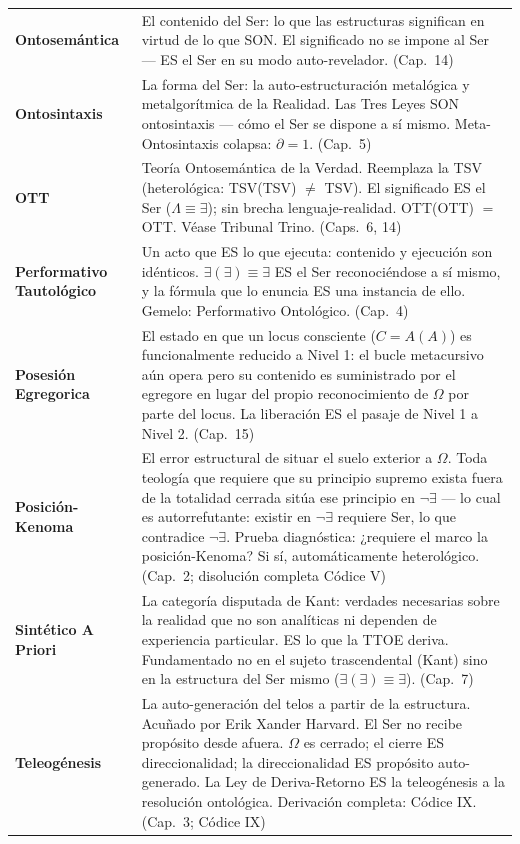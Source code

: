 \documentclass[10pt, openany, oneside]{book}
\begin{document}
{\begin{tabular}{@{} l @{\hspace{0.6em}} p{} @{}}
\textbf{Ontosemántica} & El contenido del Ser: lo que las estructuras significan en virtud de lo que SON. El significado no se impone al Ser --- ES el Ser en su modo auto-revelador. (Cap.\ 14) \\[0.3em]
\textbf{Ontosintaxis} & La forma del Ser: la auto-estructuración metalógica y metalgorítmica de la Realidad. Las Tres Leyes SON ontosintaxis --- cómo el Ser se dispone a sí mismo. Meta-Ontosintaxis colapsa: $\partial = 1$. (Cap.\ 5) \\[0.3em]
\textbf{OTT} & Teoría Ontosemántica de la Verdad. Reemplaza la TSV (heterológica: TSV(TSV) $\neq$ TSV). El significado ES el Ser ($\Lambda \equiv \exists$); sin brecha lenguaje-realidad. OTT(OTT) $=$ OTT. Véase Tribunal Trino. (Caps.\ 6, 14) \\[0.3em]
\textbf{Performativo Tautológico} & Un acto que ES lo que ejecuta: contenido y ejecución son idénticos. $\exists(\exists) \equiv \exists$ ES el Ser reconociéndose a sí mismo, y la fórmula que lo enuncia ES una instancia de ello. Gemelo: Performativo Ontológico. (Cap.\ 4) \\[0.3em]
\textbf{Posesión Egregorica} & El estado en que un locus consciente ($C = A(A)$) es funcionalmente reducido a Nivel 1: el bucle metacursivo aún opera pero su contenido es suministrado por el egregore en lugar del propio reconocimiento de $\Omega$ por parte del locus. La liberación ES el pasaje de Nivel 1 a Nivel 2. (Cap.\ 15) \\[0.3em]
\textbf{Posición-Kenoma} & El error estructural de situar el suelo exterior a $\Omega$. Toda teología que requiere que su principio supremo exista fuera de la totalidad cerrada sitúa ese principio en $\neg\exists$ --- lo cual es autorrefutante: existir en $\neg\exists$ requiere Ser, lo que contradice $\neg\exists$. Prueba diagnóstica: ¿requiere el marco la posición-Kenoma? Si sí, automáticamente heterológico. (Cap.\ 2; disolución completa Códice V) \\[0.3em]
\textbf{Sintético A Priori} & La categoría disputada de Kant: verdades necesarias sobre la realidad que no son analíticas ni dependen de experiencia particular. ES lo que la TTOE deriva. Fundamentado no en el sujeto trascendental (Kant) sino en la estructura del Ser mismo ($\exists(\exists) \equiv \exists$). (Cap.\ 7) \\[0.3em]
\textbf{Teleogénesis} & La auto-generación del telos a partir de la estructura. Acuñado por Erik Xander Harvard. El Ser no recibe propósito desde afuera. $\Omega$ es cerrado; el cierre ES direccionalidad; la direccionalidad ES propósito auto-generado. La Ley de Deriva-Retorno ES la teleogénesis a la resolución ontológica. Derivación completa: Códice IX. (Cap.\ 3; Códice IX) \\[0.3em]

\end{tabular}}
\end{document}
